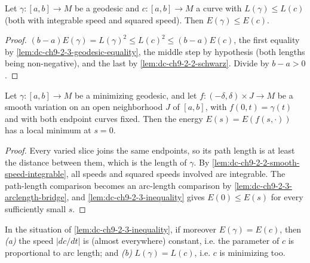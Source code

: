 \begin{lemma}
  \label{lem:dc-ch9-2-3-inequality}
  \leanok
  Let $\gamma:[a,b]\to M$ be a geodesic and $c:[a,b]\to M$ a curve with $L(\gamma)\le L(c)$
  (both with integrable speed and squared speed). Then $E(\gamma)\le E(c)$.

\end{lemma}
\begin{proof}
  \leanok
  \sketch
  $(b-a)E(\gamma)=L(\gamma)^2\le L(c)^2\le (b-a)E(c)$, the first equality by
  \cref{lem:dc-ch9-2-3-geodesic-equality}, the middle step by hypothesis (both lengths being
  non-negative), and the last by \cref{lem:dc-ch9-2-2-schwarz}. Divide by $b-a>0$.

\end{proof}
\begin{lemma}
  \label{lem:dc-ch9-2-3-smooth-variation-energy-min}
  \leanok
  Let $\gamma:[a,b]\to M$ be a minimizing geodesic, and let
  $f:(-\delta,\delta)\times J\to M$ be a smooth variation on an open
  neighborhood $J$ of $[a,b]$, with $f(0,t)=\gamma(t)$ and with both endpoint
  curves fixed. Then the energy $E(s)=E(f(s,\cdot))$ has a local minimum at
  $s=0$.
\end{lemma}
\begin{proof}
  \leanok
  \sketch
  Every varied slice joins the same endpoints, so its path length is at least
  the distance between them, which is the length of $\gamma$. By
  \cref{lem:dc-ch9-2-2-smooth-speed-integrable}, all speeds and squared speeds
  involved are integrable. The path-length comparison becomes an arc-length
  comparison by \cref{lem:dc-ch9-2-3-arclength-bridge}, and
  \cref{lem:dc-ch9-2-3-inequality} gives $E(0)\le E(s)$ for every sufficiently
  small $s$.
\end{proof}
\begin{lemma}
  \label{lem:dc-ch9-2-3-equality-case}
  \leanok
  In the situation of \cref{lem:dc-ch9-2-3-inequality}, if moreover $E(\gamma)=E(c)$, then
  \emph{(a)} the speed $|dc/dt|$ is (almost everywhere) constant, i.e. the parameter of $c$
  is proportional to arc length; and \emph{(b)} $L(\gamma)=L(c)$, i.e. $c$ is minimizing too.

\end{lemma}
